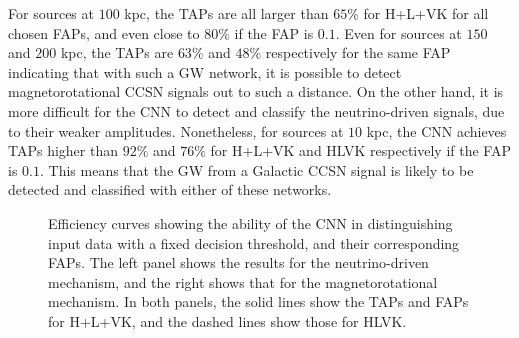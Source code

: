 \documentclass[aps,twocolumn,showpacs,groupedaddress, nofootinbib]{revtex4}  %
\begin{document}
For sources at $100$ kpc, the \acp{TAP} are all larger than $65\%$ for H+L+VK for all chosen \acp{FAP}, and even close to $80\%$ if the \ac{FAP} is $0.1$.  
Even for sources at $150$ and $200$ kpc, the \acp{TAP} are $63\%$ and $48\%$ respectively for the same \ac{FAP} indicating that with such a \ac{GW} network,
it is possible to detect magnetorotational \ac{CCSN} signals out to such a distance.
On the other hand, it is more difficult for the \ac{CNN} to detect and classify the neutrino-driven signals, due to their weaker amplitudes.
Nonetheless, for sources at $10$ kpc,
the \ac{CNN} achieves \acp{TAP} higher than $92\%$ and $76\%$ for H+L+VK and HLVK respectively if the \ac{FAP} is $0.1$.
This means that the \ac{GW} from a Galactic \ac{CCSN} signal is likely to be detected and classified with either of these networks.

\begin{figure}
     \begin{center}
%
        \quad
%
    \end{center}
    \caption{Efficiency curves showing the ability of the \ac{CNN} in distinguishing input data with a fixed decision threshold, and their corresponding \acp{FAP}.
    The left panel shows the results for the neutrino-driven mechanism, and the right shows that for the magnetorotational mechanism.
    In both panels, the solid lines show the \acp{TAP} and \acp{FAP} for H+L+VK, and the dashed lines show those for HLVK.  
\label{fig:ROCfixed}}%
\end{figure}
\end{document}
